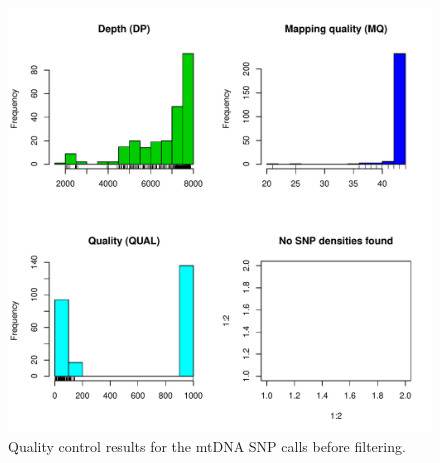 \documentclass{article}\usepackage[]{graphicx}\usepackage[]{color}
\makeatletter
\def\maxwidth{ %
  \ifdim\Gin@nat@width>\linewidth
    \linewidth
  \else
    \Gin@nat@width
  \fi
}
\newenvironment{knitrout}{}{} %
\makeatother
\begin{document}
\begin{knitrout}
\color{fgcolor}\begin{figure}[p]

\includegraphics[width=\maxwidth]{figure/plot_unfilter} \caption[Quality control results for the mtDNA SNP calls before filtering]{Quality control results for the mtDNA SNP calls before filtering.\label{fig:plot_unfilter}}
\end{figure}


\end{knitrout}
\end{document}
